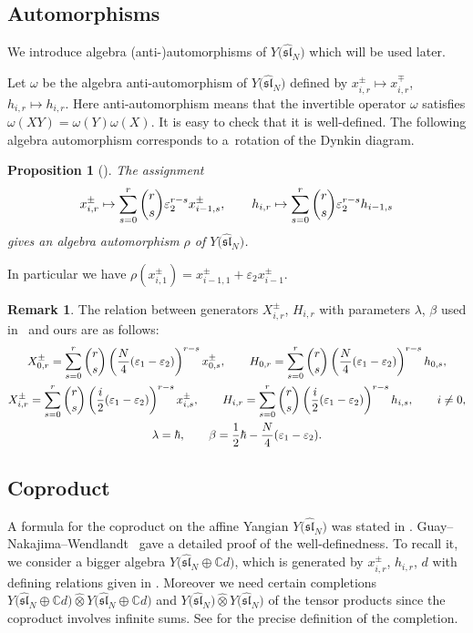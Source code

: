 \documentclass[11pt]{article}
\newtheorem{prop}[thm]{Proposition}
\theoremstyle{definition}
\newtheorem{rem}[thm]{Remark}
\numberwithin{equation}{section}
\newcommand{\ve}{\varepsilon}
\newcommand{\bbC}{\mathbb{C}}
\newcommand{\affY}{Y\big(\affsl\big)}
\newcommand{\affsl}{\hat{\mathfrak{sl}}_N}
\begin{document}
\subsection{Automorphisms}

We introduce algebra (anti-)automorphisms of $\affY$ which will be used later.

Let $\omega$ be the algebra anti-automorphism of $\affY$ defined by $x_{i,r}^{\pm} \mapsto x_{i,r}^{\mp}$, $h_{i,r} \mapsto h_{i,r}$. Here anti-automorphism means that the invertible operator $\omega$ satisfies $\omega(XY)=\omega(Y)\omega(X)$. It is easy to check that it is well-defined. The following algebra automorphism corresponds to a~rotation of the Dynkin diagram.
\begin{prop}[{\cite[Lemma~3.5]{MR2199856}}] The assignment
\begin{gather*}
x_{i,r}^{\pm} \mapsto \sum_{s=0}^r \dbinom{r}{s} \ve_2^{r-s} x_{i-1,s}^{\pm}, \qquad h_{i,r} \mapsto \sum_{s=0}^r \dbinom{r}{s} \ve_2^{r-s} h_{i-1,s}
\end{gather*}
gives an algebra automorphism $\rho$ of $\affY$.
\end{prop}
In particular we have $\rho(x_{i,1}^{\pm}) = x_{i-1,1}^{\pm} + \ve_2 x_{i-1}^{\pm}$.
\begin{rem}The relation between generators $X_{i,r}^{\pm}$, $H_{i,r}$ with parameters $\lambda$, $\beta$ used in~\cite{MR2199856,MR2323534} and ours are as follows:
\begin{gather*}
X_{0,r}^{\pm} = \sum_{s=0}^r \dbinom{r}{s} \left( \dfrac{N}{4}(\ve_1-\ve_2)\right)^{r-s} x_{0,s}^{\pm},\qquad H_{0,r} = \sum_{s=0}^r \dbinom{r}{s} \left( \dfrac{N}{4}(\ve_1-\ve_2)\right)^{r-s} h_{0,s},\\
X_{i,r}^{\pm} = \sum_{s=0}^r \dbinom{r}{s} \left( \dfrac{i}{2}(\ve_1-\ve_2)\right)^{r-s} x_{i,s}^{\pm}, \qquad H_{i,r} = \sum_{s=0}^r \dbinom{r}{s} \left( \dfrac{i}{2}(\ve_1-\ve_2)\right)^{r-s} h_{i,s}, \qquad i \neq 0,\\
\lambda = \hbar, \qquad \beta = \frac{1}{2} \hbar - \dfrac{N}{4}(\ve_1-\ve_2).
\end{gather*}
\end{rem}

\subsection{Coproduct}

A formula for the coproduct on the affine Yangian $\affY$ was stated in \cite{MR2323534}. Guay--Nakajima--Wendlandt~\cite{MR3861718} gave a detailed proof of the well-definedness. To recall it, we consider a bigger algebra $Y\big(\affsl \oplus \bbC d\big)$, which is generated by $x_{i,r}^{\pm}$, $h_{i,r}$, $d$ with defining relations given in \cite[equation~(2.8)]{MR3861718}. Moreover we need certain completions $Y\big(\affsl \oplus \bbC d\big) \widehat{\otimes} Y\big(\affsl \oplus \bbC d\big)$ and $\affY \widehat{\otimes} \affY$ of the tensor products since the coproduct involves infinite sums. See \cite[Section~5]{MR3861718} for the precise definition of the completion.
\end{document}
